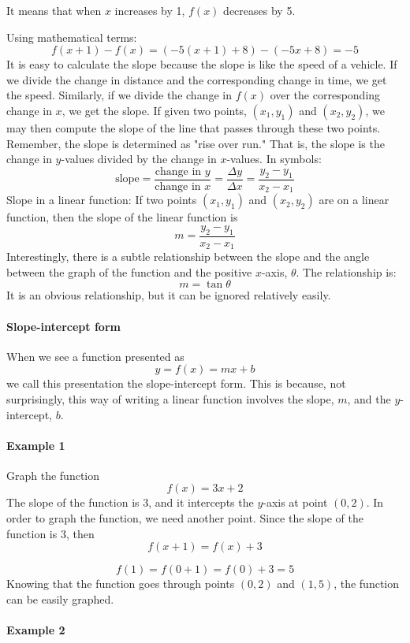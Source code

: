 It means that when $x$ increases by 1, $f(x)$ decreases by 5.

Using mathematical terms:
$$
f(x+1) - f(x) = (-5(x+1) + 8) - (-5x + 8) = -5
$$
It is easy to calculate the slope because the slope is like the speed of a vehicle. If we divide the change in distance and the corresponding change in time, we get the speed. Similarly, if we divide the change in $f(x)$ over the corresponding change in $x$, we get the slope. If given two points, $(x_1, y_1)$ and $(x_2, y_2)$, we may then compute the slope of the line that passes through these two points. Remember, the slope is determined as "rise over run." That is, the slope is the change in $y$-values divided by the change in $x$-values. In symbols:
$$
\text{slope} = \frac{\text{change in } y}{\text{change in } x} = \frac{\Delta y}{\Delta x} = \frac{y_2 - y_1}{x_2 - x_1}
$$
Slope in a linear function: If two points $(x_1, y_1)$ and $(x_2, y_2)$ are on a linear function, then the slope of the linear function is
$$
m = \frac{y_2 - y_1}{x_2 - x_1}
$$
Interestingly, there is a subtle relationship between the slope and the angle between the graph of the function and the positive $x$-axis, $\theta$. The relationship is:
$$
m = \tan \theta
$$
It is an obvious relationship, but it can be ignored relatively easily.

\paragraph{Slope-intercept form}

When we see a function presented as
$$
y = f(x) = mx + b
$$
we call this presentation the slope-intercept form. This is because, not surprisingly, this way of writing a linear function involves the slope, $m$, and the $y$-intercept, $b$.

\paragraph{Example 1}

Graph the function 
$$
f(x) = 3x + 2
$$
The slope of the function is 3, and it intercepts the $y$-axis at point $(0, 2)$. In order to graph the function, we need another point. Since the slope of the function is 3, then
$$
f(x + 1) = f(x) + 3
$$

$$
f(1) = f(0 + 1) = f(0) + 3 = 5
$$
Knowing that the function goes through points $(0, 2)$ and $(1, 5)$, the function can be easily graphed.

\paragraph{Example 2}

